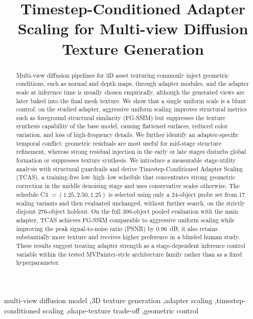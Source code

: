 \documentclass[times,twocolumn,final]{elsarticle}
\begin{document}
\begin{frontmatter}

\title{Timestep-Conditioned Adapter Scaling for Multi-view Diffusion Texture Generation}


\begin{abstract}
Multi-view diffusion pipelines for 3D asset texturing commonly inject geometric conditions, such as normal and depth maps, through adapter modules, and the adapter scale at inference time is usually chosen empirically, although the generated views are later baked into the final mesh texture. We show that a single uniform scale is a blunt control: on the studied adapter, aggressive uniform scaling improves structural metrics such as foreground structural similarity (FG-SSIM) but suppresses the texture synthesis capability of the base model, causing flattened surfaces, reduced color variation, and loss of high-frequency details. We further identify an adapter-specific temporal conflict: geometric residuals are most useful for mid-stage structure refinement, whereas strong residual injection in the early or late stages disturbs global formation or suppresses texture synthesis. We introduce a measurable stage-utility analysis with structural guardrails and derive Timestep-Conditioned Adapter Scaling (TCAS), a training-free low--high--low schedule that concentrates strong geometric correction in the middle denoising stage and uses conservative scales otherwise. The schedule C3 $=(1.25, 2.50, 1.25)$ is selected using only a 24-object probe set from 17 scaling variants and then evaluated unchanged, without further search, on the strictly disjoint 276-object holdout. On the full 300-object pooled evaluation with the main adapter, TCAS achieves FG-SSIM comparable to aggressive uniform scaling while improving the peak signal-to-noise ratio (PSNR) by 0.96~dB; it also retains substantially more texture and receives higher preference in a blinded human study. These results suggest treating adapter strength as a stage-dependent inference control variable within the tested MVPainter-style architecture family rather than as a fixed hyperparameter.
\end{abstract}

\begin{keyword}
\KWD
multi-view diffusion model \sep 3D texture generation \sep adapter scaling \sep timestep-conditioned scaling \sep shape-texture trade-off \sep geometric control
\end{keyword}

\end{frontmatter}
\end{document}
